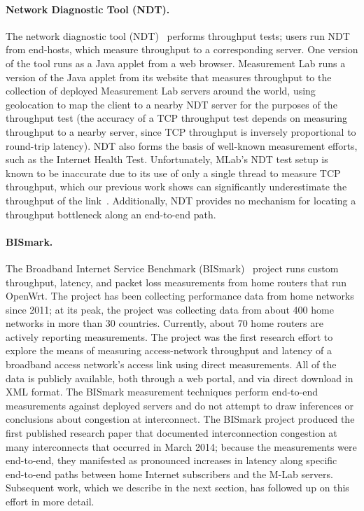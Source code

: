 \paragraph{Network Diagnostic Tool (NDT).} The network diagnostic tool (NDT)~\cite{www-ndt}
performs throughput tests; users run NDT from end-hosts,
which measure throughput to a corresponding server. One version of the
tool runs as a Java applet from a web browser. Measurement Lab runs a
version of the Java applet from its website that measures throughput to
the collection of deployed Measurement Lab servers around the world,
using geolocation to map the client to a nearby NDT server for the
purposes of the throughput test (the accuracy of a TCP throughput test
depends on measuring throughput to a nearby server, since TCP throughput
is inversely proportional to round-trip latency). 
NDT also forms the basis of well-known measurement efforts, such as the
Internet Health Test. 
Unfortunately, MLab's NDT
test setup is known to be inaccurate due to its use of only a single thread to
measure TCP throughput, which our previous work shows can significantly
underestimate the throughput of the link~\cite{sundaresan2011}. Additionally, NDT
provides no mechanism for locating a throughput bottleneck along an
end-to-end path.


\paragraph{BISmark.} The Broadband Internet Service Benchmark
(BISmark)~\cite{sundaresan2011,www-bismark} 
project runs custom throughput, latency, and packet loss measurements
from home routers that run
OpenWrt. The project has been
collecting 
performance data from home networks since 2011; at its peak, the project
was collecting data from about 400 home networks in more than 30
countries. Currently, about 70 home routers are actively reporting
measurements. The project was the first research effort to explore the
means of measuring access-network throughput and latency of a broadband
access network’s access link using direct measurements. All of the data
is publicly available, both through a web portal, and via direct
download in XML format. The BISmark measurement techniques perform
end-to-end measurements against deployed servers and do not attempt to
draw inferences or conclusions about congestion at interconnect. The
BISmark project produced the first published research paper that
documented interconnection congestion at many interconnects that
occurred in March 2014; because the measurements were end-to-end, they
manifested as pronounced increases in latency along specific end-to-end
paths between home Internet subscribers and the M-Lab
servers. Subsequent work, which we describe in the next section, has
followed up on this effort in more detail. 


